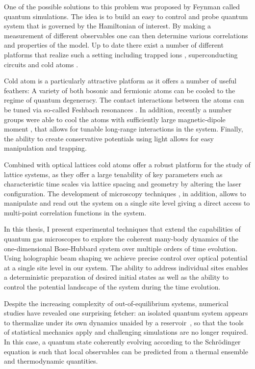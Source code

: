 One of the possible solutions to this problem was proposed by Feynman \cite{nt. J. Theor. Phys. 21,467 (1982)} called quantum simulations. The idea is to build an easy to control and probe quantum system that is governed by the Hamiltonian of interest. By making a measurement of different observables one can then determine various correlations and properties of the model. Up to date there exist a number of different platforms that realize such a setting including trapped ions \cite{Nature Phys.8, 277 (2012)}, superconducting circuits \cite{Nature Phys. 8, 292 (2012)} and cold atoms \cite{Nature Phys. 8, 267 (2012)}.

Cold atom is a particularly attractive platform as it offers a number of useful feathers: A variety of both bosonic and fermionic atoms can be cooled to the regime of quantum degeneracy. The contact interactions between the atoms can be tuned via so-called Feshbach resonances \cite{Rev. Mod. Phys., 82:1225, 2010}. In addition, recently a number groups were able to cool the atoms with sufficiently large magnetic-dipole moment \cite{disprosium erbium}, that allows for tunable long-range interactions in the system. Finally, the ability to create conservative potentials using light allows for easy manipulation and trapping.  

Combined with optical lattices cold atoms offer a robust platform for the study of lattice systems, as they offer a large tenability of key parameters such as characteristic time scales via lattice spacing and geometry by altering the laser configuration. The development of microscopy techniques \cite{QGM, Nature 467, 68 (2010), shtefan kure}, in addition, allows to manipulate and read out the system on a single site level giving a direct access to multi-point correlation functions in the system.

In this thesis, I present experimental techniques that extend the capabilities of quantum gas microscopes to explore the coherent many-body dynamics of the one-dimensional Bose-Hubbard system over multiple orders of time evolution. Using holographic beam shaping we achieve precise control over optical potential at a single site level in our system. The ability to address individual sites enables a deterministic preparation of desired initial states as well as the ability to control the potential landscape of the system during the time evolution.

Despite the increasing complexity of out-of-equilibrium systems, numerical studies have revealed one surprising fetcher: an isolated quantum system appears to thermalize under its own dynamics unaided by a reservoir~\cite{Deutsch1991, Olshanii2008,Eisert2015}, so that the tools of statistical mechanics apply and challenging simulations are no longer required. In this case, a quantum state coherently evolving according to the Schr\"{o}dinger equation is such that local observables can be predicted from a thermal ensemble and thermodynamic quantities. 

